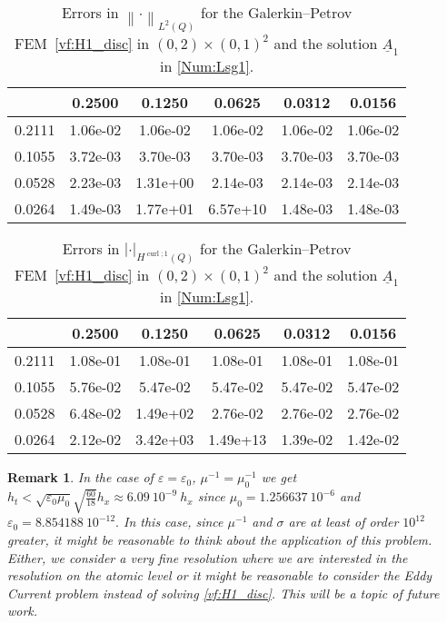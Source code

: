\documentclass[a4paper,11pt]{article}
\newtheorem{rmk}[thm]{Remark}
\newcommand{\cu}{\operatorname{curl}}
\renewcommand{\vec}[1]{\underline{#1}}
\newcommand{\abs}[1]{\left\lvert{#1}\right\rvert}
\newcommand{\norm}[1]{{\left\lVert{#1}\right\rVert}}
\begin{document}
\begin{table}[!ht]
	\caption{Errors in $\norm{\cdot}_{L^2(Q)}$ for the Galerkin--Petrov FEM~\eqref{vf:H1_disc} in $(0,{2})\times(0,1)^2$ and the solution $\vec A_1$ in \eqref{Num:Lsg1}.}
	\begin{center}
	\begin{tabular}{c|ccccc}
			\diagbox{$h_x$}{\vspace*{-.1cm}$h_t$}&   0.2500 &  0.1250 &  0.0625 &  0.0312 &  0.0156 \\
			\hline\hline
		0.2111 & 1.06e-02 & 1.06e-02 & 1.06e-02 & 1.06e-02 & 1.06e-02 \\
		0.1055 & 3.72e-03 & 3.70e-03 & 3.70e-03 & 3.70e-03 & 3.70e-03 \\
		0.0528 & 2.23e-03 & 1.31e+00 & 2.14e-03 & 2.14e-03 & 2.14e-03 \\
		0.0264 & 1.49e-03 & 1.77e+01 & 6.57e+10 & 1.48e-03 & 1.48e-03 \\
	\end{tabular}\label{Tab:SigmaposL2}
	\end{center}
\end{table}


	\begin{table}[!ht]
	\caption{Errors in $\abs{\cdot}_{H^{\cu;1}(Q)}$ for the Galerkin--Petrov FEM~\eqref{vf:H1_disc} in $(0,{2})\times(0,1)^2$ and the solution $\vec A_1$ in \eqref{Num:Lsg1}.}
	\begin{center}
	\begin{tabular}{c|ccccc}
		\diagbox{$h_x$}{\vspace*{-.1cm}$h_t$}&   0.2500 & 0.1250 &  0.0625 &  0.0312 &  0.0156 \\
			\hline\hline
		0.2111 & 1.08e-01 & 1.08e-01 & 1.08e-01 & 1.08e-01 & 1.08e-01 \\
		0.1055 & 5.76e-02 & 5.47e-02 & 5.47e-02 & 5.47e-02 & 5.47e-02 \\
		0.0528 & 6.48e-02 & 1.49e+02 & 2.76e-02 & 2.76e-02 & 2.76e-02 \\
		0.0264 & 2.12e-02 & 3.42e+03 & 1.49e+13 & 1.39e-02 & 1.42e-02 \\
	\end{tabular}\label{Tab:SigmaposH1C}
\end{center}
\end{table}


\begin{rmk}
	In the case of $\varepsilon = \varepsilon_0$,  $\mu^{-1} = \mu_0^{-1}$ we get 
	$	h_t  <\sqrt{ \varepsilon_0\mu_0}\sqrt{\frac{60}{18}} h_x\approx 6.09	\ 10^{-9 } \ h_x$ 
	since  $\mu_0 = 1.256637\ 10^{-6}$ and $  \varepsilon_0 = 8.854188\ 10^{-12}.$ In this case, since $\mu^{-1}$ and $\sigma$ are at least of order $10^{12}$ greater, it might be reasonable to think about the application of this problem. Either, we consider a very fine resolution where we are interested in the resolution on the atomic level or it might be reasonable to consider the Eddy Current problem instead of solving \eqref{vf:H1_disc}. This will be a topic of future work.
\end{rmk}
\end{document}
